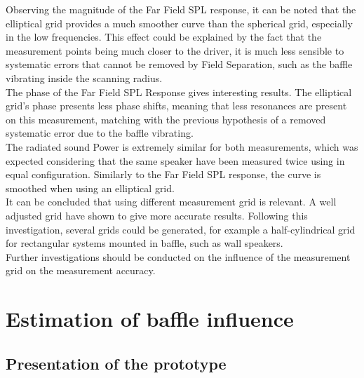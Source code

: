 \documentclass{report}
\begin{document}
Observing the magnitude of the Far Field SPL response, it can be noted that the elliptical grid provides a much smoother curve than the spherical grid, especially in the low frequencies. This effect could be explained by the fact that the measurement points being much closer to the driver, it is much less sensible to systematic errors that cannot be removed by Field Separation, such as the baffle vibrating inside the scanning radius. \\

The phase of the Far Field SPL Response gives interesting results. The elliptical grid's phase presents less phase shifts, meaning that less resonances are present on this measurement, matching with the previous hypothesis of a removed systematic error due to the baffle vibrating. \\

The radiated sound Power is extremely similar for both measurements, which was expected considering that the same speaker have been measured twice using in equal configuration. Similarly to the Far Field SPL response, the curve is smoothed when using an elliptical grid. \\

It can be concluded that using different measurement grid is relevant. A well adjusted grid have shown to give more accurate results. Following this investigation, several grids could be generated, for example a half-cylindrical grid for rectangular systems mounted in baffle, such as wall speakers.\\
Further investigations should be conducted on the influence of the measurement grid on the measurement accuracy.



\section{Estimation of baffle influence}

\subsection{Presentation of the prototype}
\end{document}
